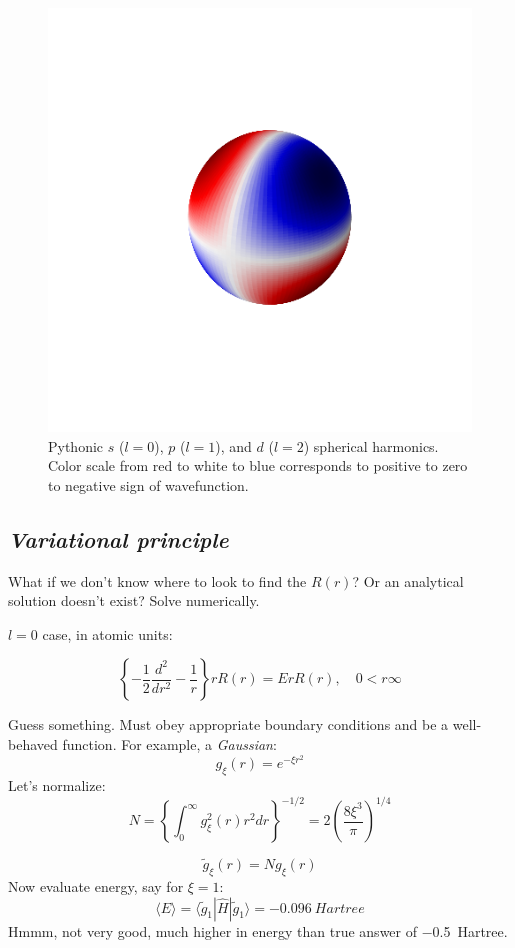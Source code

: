 \documentclass[11pt]{article}
\begin{document}
\begin{figure}
\includegraphics[scale=0.4]{./Images/d.png}
\caption{Pythonic $s$ ($l = 0$), $p$ ($l=1$), and $d$ ($l=2$) spherical harmonics. Color scale from red to white to blue corresponds to positive to zero to negative sign of wavefunction.}
\end{figure}

\subsection{\emph{Variational principle}}
\label{sec:org8be8947}
What if we don't know where to look to find the \(R(r)\)?  Or an analytical solution doesn't exist?  Solve numerically.

\(l=0\) case, in atomic units:

\[\left\{-\frac{1}{2}\frac{d^2}{dr^2} -\frac{1}{r}\right\} rR(r) = ErR(r),\quad 0<r\infty \]

Guess something.  Must obey appropriate boundary conditions and be a well-behaved function.  For example, a \emph{Gaussian}:
\[g_\xi(r) = e^{-\xi r^2}\]
Let's normalize:
\[N = \left\{ \int_0^\infty g_\xi^2(r) r^2 dr \right\}^{-1/2} = 2 \left(\frac{8\xi^3}{\pi}\right)^{1/4} \]

\[\tilde{g}_\xi(r) = N g_\xi(r)\]
Now evaluate energy, say for \(\xi=1\):
\[\langle E \rangle = \langle \tilde{g}_1|\hat{H}|\tilde{g}_1\rangle = \SI{-0.096}{Hartree} \]
Hmmm, not very good, much higher in energy than true answer of \SI{-0.5}{Hartree}. 
\end{document}
